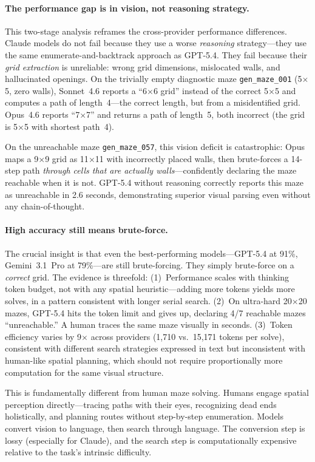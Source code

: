 \documentclass[11pt]{article}
\begin{document}
\paragraph{The performance gap is in vision, not reasoning strategy.}
This two-stage analysis reframes the cross-provider performance differences.
Claude models do not fail because they use a worse \emph{reasoning} strategy---they use the same enumerate-and-backtrack approach as GPT-5.4.
They fail because their \emph{grid extraction} is unreliable: wrong grid dimensions, mislocated walls, and hallucinated openings.
On the trivially empty diagnostic maze \texttt{gen\_maze\_001} (5$\times$5, zero walls), Sonnet~4.6 reports a ``6$\times$6 grid'' instead of the correct 5$\times$5 and computes a path of length~4---the correct length, but from a misidentified grid.
Opus~4.6 reports ``7$\times$7'' and returns a path of length~5, both incorrect (the grid is 5$\times$5 with shortest path~4).

On the unreachable maze \texttt{gen\_maze\_057}, this vision deficit is catastrophic: Opus maps a 9$\times$9 grid as 11$\times$11 with incorrectly placed walls, then brute-forces a 14-step path \emph{through cells that are actually walls}---confidently declaring the maze reachable when it is not.
GPT-5.4 without reasoning correctly reports this maze as unreachable in 2.6 seconds, demonstrating superior visual parsing even without any chain-of-thought.

\paragraph{High accuracy still means brute-force.}
The crucial insight is that even the best-performing models---GPT-5.4 at 91\%, Gemini~3.1~Pro at 79\%---are still brute-forcing.
They simply brute-force on a \emph{correct} grid.
The evidence is threefold:
(1)~Performance scales with thinking token budget, not with any spatial heuristic---adding more tokens yields more solves, in a pattern consistent with longer serial search.
(2)~On ultra-hard 20$\times$20 mazes, GPT-5.4 hits the token limit and gives up, declaring 4/7 reachable mazes ``unreachable.''
A human traces the same maze visually in seconds.
(3)~Token efficiency varies by 9$\times$ across providers (1,710 vs.\ 15,171 tokens per solve), consistent with different search strategies expressed in text but inconsistent with human-like spatial planning, which should not require proportionally more computation for the same visual structure.

This is fundamentally different from human maze solving.
Humans engage spatial perception directly---tracing paths with their eyes, recognizing dead ends holistically, and planning routes without step-by-step enumeration.
Models convert vision to language, then search through language.
The conversion step is lossy (especially for Claude), and the search step is computationally expensive relative to the task's intrinsic difficulty.
\end{document}
